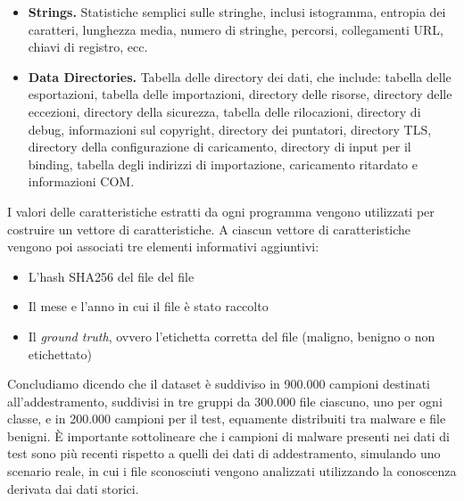 \begin{itemize}
	\item \textbf{Strings.} Statistiche semplici sulle stringhe, inclusi istogramma, entropia dei caratteri, lunghezza media, numero di stringhe, percorsi, collegamenti URL, chiavi di registro, ecc.
	\item \textbf{Data Directories.} Tabella delle directory dei dati, che include: tabella delle esportazioni, tabella delle importazioni, directory delle risorse, directory delle eccezioni, directory della sicurezza, tabella delle rilocazioni, directory di debug, informazioni sul copyright, directory dei puntatori, directory TLS, directory della configurazione di caricamento, directory di input per il binding, tabella degli indirizzi di importazione, caricamento ritardato e informazioni COM.
\end{itemize}
I valori delle caratteristiche estratti da ogni programma vengono utilizzati per costruire un vettore di caratteristiche. A ciascun vettore di caratteristiche vengono poi associati tre elementi informativi aggiuntivi: 
\begin{itemize}
	\item L'hash SHA256 del file del file
	\item Il mese e l'anno in cui il file è stato raccolto
	\item Il \textit{ground truth}, ovvero l'etichetta corretta del file (maligno, benigno o non etichettato)
\end{itemize}  
Concludiamo dicendo che il dataset è suddiviso in 900.000 campioni destinati all'addestramento, suddivisi in tre gruppi da 300.000 file ciascuno, uno per ogni classe, e in 200.000 campioni per il test, equamente distribuiti tra malware e file benigni.  È importante sottolineare che i campioni di malware presenti nei dati di test sono più recenti rispetto a quelli dei dati di addestramento, simulando uno scenario reale, in cui i file sconosciuti vengono analizzati utilizzando la conoscenza derivata dai dati storici.
